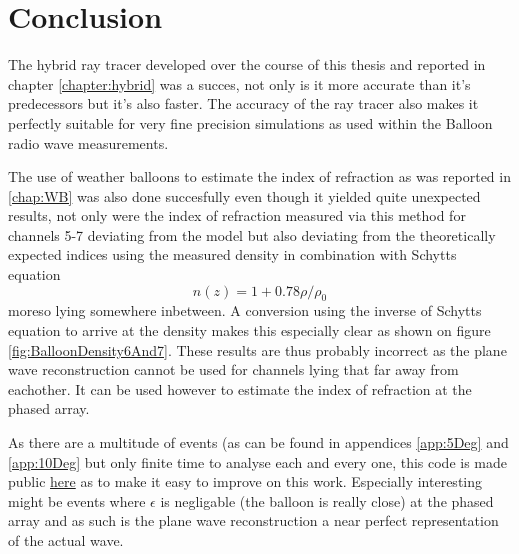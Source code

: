 \chapter*{Conclusion}
The hybrid ray tracer developed over the course of this thesis and reported in
chapter \ref{chapter:hybrid} was a succes, not only is it more accurate than
it's predecessors but it's also faster.  The accuracy of the ray tracer also
makes it perfectly suitable for very fine precision simulations as used within
the Balloon radio wave measurements.

The use of weather balloons to estimate the index of refraction as
was reported in \ref{chap:WB} was also done succesfully even though
it yielded quite unexpected results, not only were the index of
refraction measured via this method for channels 5-7 deviating from the model but
also deviating from the theoretically expected indices using the
measured density in combination with Schytts equation
\begin{equation}
	n(z) = 1+ 0.78\rho/\rho_0
\end{equation}
moreso lying somewhere inbetween. A conversion using the inverse of
Schytts equation to arrive at the density makes this especially
clear as shown on figure \ref{fig:BalloonDensity6And7}.
These results are thus probably incorrect as the plane wave
reconstruction cannot be used for channels lying that far 
away from eachother. It can be used however to estimate
the index of refraction at the phased array.

As there are a multitude of events (as can be found in appendices
\ref{app:5Deg} and \ref{app:10Deg} but only finite time to analyse
each and every one, this code is made public
\href{https://github.com/arthuradriaens-code/projects-mt.git}{here}
as to make it easy to improve on this work.  Especially interesting
might be events where $\epsilon$ is negligable (the balloon is
really close) at the phased array and as such is the plane wave
reconstruction a near perfect representation of the actual wave.

